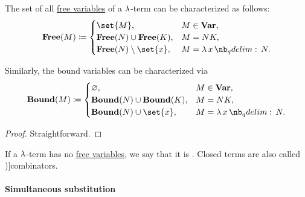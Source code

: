\begin{proposition}\label{thm:lambda_variable_freeness_characterization}
  The set of all \hyperref[def:lambda_variable_freeness]{free variables} of a \( \mathrm{\lambda} \)-term can be characterized as follows:
  \begin{equation*}
    \op*{Free}(M) \coloneqq \begin{cases}
      \set{ M },                         &M \in \op*{Var}, \\
      \op*{Free}(N) \cup \op*{Free}(K),  &M = N K, \\
      \op*{Free}(N) \setminus \set{ x }, &M = \qabs x N. \\
    \end{cases}
  \end{equation*}

  Similarly, the bound variables can be characterized via
  \begin{equation*}
    \op*{Bound}(M) \coloneqq \begin{cases}
      \varnothing,                        &M \in \op*{Var}, \\
      \op*{Bound}(N) \cup \op*{Bound}(K), &M = N K, \\
      \op*{Bound}(N) \cup \set{ x },      &M = \qabs x N. \\
    \end{cases}
  \end{equation*}
\end{proposition}
\begin{proof}
  Straightforward.
\end{proof}

\begin{definition}\label{def:lambda_combinator}
  If a \( \mathrm{\lambda} \)-term has no \hyperref[def:lambda_variable_freeness]{free variables}, we say that it is . Closed terms are also called \term[ru=комбинаторы (\cite[188]{Герасимов2011Вычислимость})]{combinators}.
\end{definition}

\paragraph{Simultaneous substitution}

